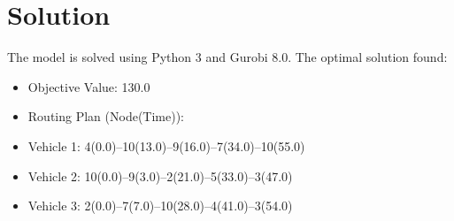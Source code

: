 \documentclass[a4paper]{article}
\begin{document}
\section{Solution}
The model is solved using Python 3 and Gurobi 8.0. The optimal solution found:\\
\begin{itemize}
  \item Objective Value: 130.0
  \item Routing Plan (Node(Time)):
  \item Vehicle 1: 4(0.0)--10(13.0)--9(16.0)--7(34.0)--10(55.0)
  \item Vehicle 2: 10(0.0)--9(3.0)--2(21.0)--5(33.0)--3(47.0)
  \item Vehicle 3: 2(0.0)--7(7.0)--10(28.0)--4(41.0)--3(54.0)
\end{itemize}
\end{document}
